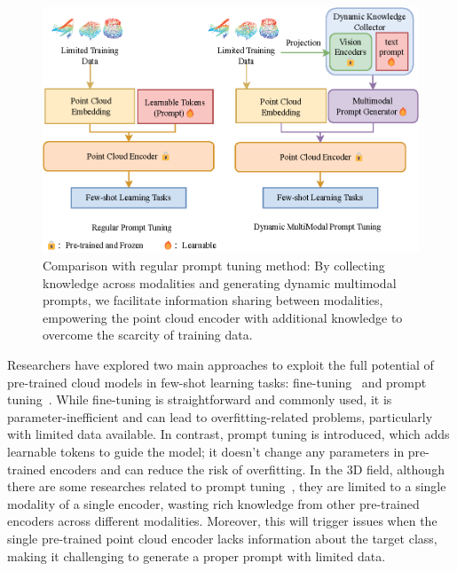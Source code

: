 \documentclass{ecai}
\begin{document}
\begin{figure}[t]
\centerline{\includegraphics[width=0.95\linewidth]{compare.eps}}
\caption{Comparison with regular prompt tuning method: By collecting knowledge across modalities and generating dynamic multimodal prompts, we facilitate information sharing between modalities, empowering the point cloud encoder with additional knowledge to overcome the scarcity of training data.} \label{compare}
\vspace{4pt}
\end{figure}

Researchers have explored two main approaches to exploit the full potential of pre-trained cloud models in few-shot learning tasks:
fine-tuning~\cite{wang2023take, qi2023contrast, palakodety2020mining} and prompt tuning~\cite{jia2022visual, zha2023instance}. While fine-tuning is straightforward and commonly used, it is parameter-inefficient and can lead to overfitting-related problems, particularly with limited data available. In contrast, prompt tuning is introduced, which adds learnable tokens to guide the model; it doesn't change any parameters in pre-trained encoders and can reduce the risk of overfitting. In the 3D field, although there are some researches related to prompt tuning~\cite{hegde2023clip,zhu2023pointclip,zha2023instance}, they are limited to a single modality of a single encoder, wasting rich knowledge from other pre-trained encoders across different modalities. Moreover, this will trigger issues when the single pre-trained point cloud encoder lacks information about the target class, making it challenging to generate a proper prompt with limited data.
\end{document}
